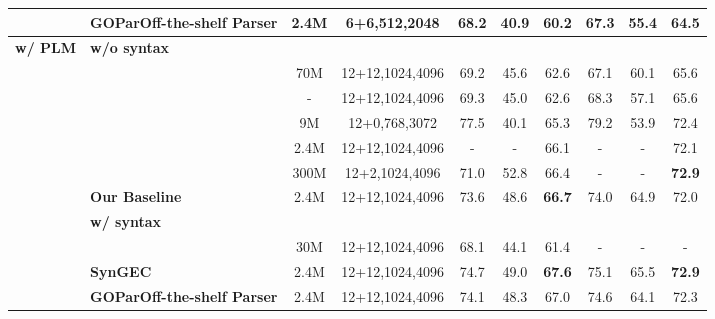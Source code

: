 \documentclass[11pt]{article}
\begin{document}
\begin{table*}[tp!]
{\begin{tabular}{clcccccccc}
                                   & \hspace{0.3cm}\textbf{GOParOff-the-shelf Parser}&   2.4M &   6+6,512,2048  & 68.2          & 40.9       & 60.2           & 67.3       & 55.4       & 64.5          \\\hline \hline
\multirow{12}{*}{\textbf{w/ PLM}}  & \multicolumn{9}{l}{\textbf{w/o syntax}}                                                                  \\
                                    & \citet{kaneko2020encoder}&   70M &   12+12,1024,4096            & 69.2          & 45.6       & 62.6          & 67.1       & 60.1       & 65.6          \\
                                  & \citet{katsumata2020stronger}&   - &   12+12,1024,4096              & 69.3          & 45.0       & 62.6          & 68.3       & 57.1       & 65.6          \\
                                  & \citet{omelianchuk2020gector}&   9M &   12+0,768,3072            & 77.5          & 40.1       & 65.3          & 79.2       & 53.9       & 72.4          \\
                                   & \citet{rothe2021recipe}&   2.4M &   12+12,1024,4096            & -             & -          & 66.1         & -          & -          & 72.1          \\
                                  & \citet{DBLP:conf/acl/SunGWW20}&   300M &   12+2,1024,4096            & 71.0             & 52.8          & 66.4         & -          & -          & \textbf{72.9}          \\
                                    & \textbf{Our Baseline}&   2.4M &   12+12,1024,4096 &  73.6          & 	48.6      & 	\textbf{66.7}         & 74.0       & 64.9       & 72.0          \\ 
                                  \cline{2-10} 
                                  & \multicolumn{9}{l}{\textbf{w/ syntax}}                                                                   \\ 
                                & \citet{li2022syntax}&   30M &   12+12,1024,4096               & 68.1 &  44.1  & 61.4          & -       & -       & -          \\
                                  & \textbf{SynGEC}&   2.4M  &   12+12,1024,4096 & 74.7 & 49.0      & \textbf{67.6}          & 75.1      & 65.5      & \textbf{72.9}          \\ 
                                   & \hspace{0.3cm}\textbf{GOParOff-the-shelf Parser}&   2.4M &   12+12,1024,4096 & 74.1          & 48.3       & 67.0          & 74.6       & 64.1       & 72.3          \\

\end{tabular}}
\end{table*}
\end{document}
